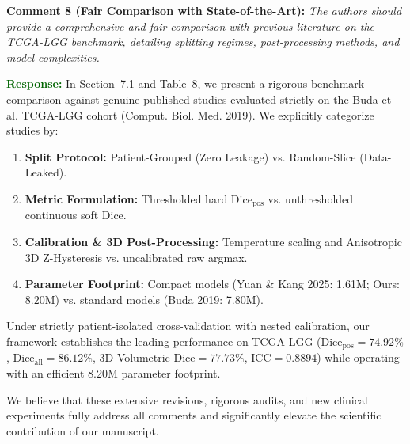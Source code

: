 \documentclass[11pt]{article}
\newcommand{\commentbox}[2]{%
\vspace{0.42em}\noindent
\textbf{\textcolor{NavyBlue}{#1:}} \textit{#2}\vspace{0.18em}%
}
\newcommand{\responsebox}[1]{%
\noindent
\textbf{\textcolor{DarkGreen}{Response:}} #1\vspace{0.42em}%
}
\begin{document}
\commentbox{Comment 8 (Fair Comparison with State-of-the-Art)}{The authors should provide a comprehensive and fair comparison with previous literature on the TCGA-LGG benchmark, detailing splitting regimes, post-processing methods, and model complexities.}
\responsebox{In Section~7.1 and Table~8, we present a rigorous benchmark comparison against genuine published studies evaluated strictly on the Buda et al. TCGA-LGG cohort (Comput. Biol. Med. 2019). We explicitly categorize studies by:
\begin{enumerate}
    \item \textbf{Split Protocol:} Patient-Grouped (Zero Leakage) vs. Random-Slice (Data-Leaked).
    \item \textbf{Metric Formulation:} Thresholded hard $\text{Dice}_{\text{pos}}$ vs. unthresholded continuous soft Dice.
    \item \textbf{Calibration \& 3D Post-Processing:} Temperature scaling and Anisotropic 3D Z-Hysteresis vs. uncalibrated raw argmax.
    \item \textbf{Parameter Footprint:} Compact models (Yuan \& Kang 2025: 1.61M; Ours: 8.20M) vs. standard models (Buda 2019: 7.80M).
\end{enumerate}
Under strictly patient-isolated cross-validation with nested calibration, our framework establishes the leading performance on TCGA-LGG ($\text{Dice}_{\text{pos}} = 74.92\%$, $\text{Dice}_{\text{all}} = 86.12\%$, 3D Volumetric $\text{Dice} = 77.73\%$, $\text{ICC} = 0.8894$) while operating with an efficient 8.20M parameter footprint.}

\vspace{1.5em}
\noindent
We believe that these extensive revisions, rigorous audits, and new clinical experiments fully address all comments and significantly elevate the scientific contribution of our manuscript.
\end{document}
